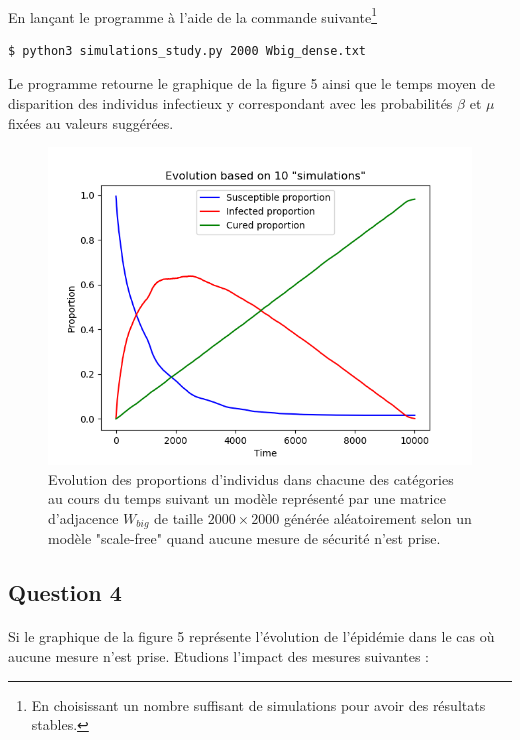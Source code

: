 \documentclass[a4paper, 12pt, oneside]{article}
\begin{document}
\paragraph{}En lançant le programme à l'aide de la commande suivante\footnote{En choisissant un nombre suffisant de simulations pour avoir des résultats stables.} 

\begin{lstlisting}[language=bash]
$ python3 simulations_study.py 2000 Wbig_dense.txt 
\end{lstlisting}

\noindent Le programme retourne le graphique de la figure 5 ainsi que le temps moyen de disparition des individus infectieux y correspondant avec les probabilités $\beta$ et $\mu$ fixées au valeurs suggérées.

\begin{figure}[H]
	\centering
	\includegraphics[scale=1]{Wbig_dense_simulations.png} 
	\caption{Evolution des proportions d'individus dans chacune des catégories au cours du temps suivant un modèle représenté par une matrice d'adjacence $W_{big}$ de taille $2000 \times 2000$ générée aléatoirement selon un modèle "scale-free" quand aucune mesure de sécurité n'est prise.}
\end{figure}

\subsection{Question 4}

\paragraph{}Si le graphique de la figure 5 représente l'évolution de l'épidémie dans le cas où aucune mesure n'est prise. Etudions l'impact des mesures suivantes :
\end{document}
